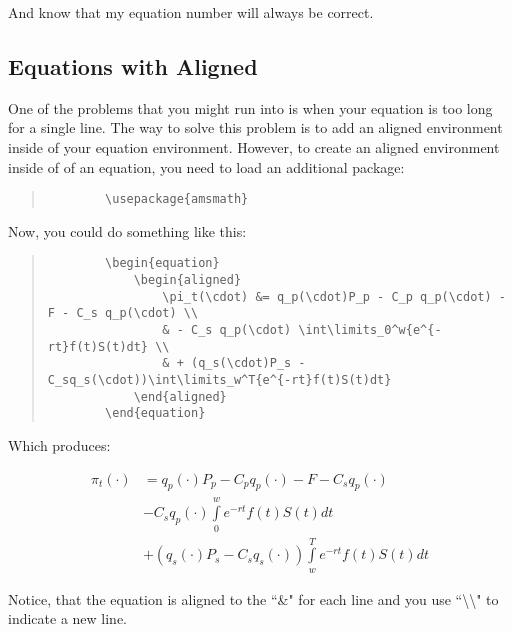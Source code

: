 And know that my equation number will always be correct.

\subsection{Equations with Aligned}

One of the problems that you might run into is when your equation is too long for a single line.  The way to solve this problem is to add an aligned environment inside of your equation environment.  However, to create an aligned environment inside of of an equation, you need to load an additional package:

\begin{quote}
	\begin{verbatim}
		\usepackage{amsmath}
	\end{verbatim}
\end{quote}

Now, you could do something like this:

\begin{quote}
	\begin{verbatim}
		\begin{equation}
			\begin{aligned}
	  			\pi_t(\cdot) &= q_p(\cdot)P_p - C_p q_p(\cdot) - F - C_s q_p(\cdot) \\
	  			& - C_s q_p(\cdot) \int\limits_0^w{e^{-rt}f(t)S(t)dt} \\
	  			& + (q_s(\cdot)P_s - C_sq_s(\cdot))\int\limits_w^T{e^{-rt}f(t)S(t)dt}
	 		\end{aligned}
		\end{equation}
	\end{verbatim}
\end{quote}

Which produces:

\begin{equation}
	\begin{aligned}
		\pi_t(\cdot) &= q_p(\cdot)P_p - C_p q_p(\cdot) - F - C_s q_p(\cdot) \\
	  	& - C_s q_p(\cdot) \int\limits_0^w{e^{-rt}f(t)S(t)dt} \\
	  	& + (q_s(\cdot)P_s - C_sq_s(\cdot))\int\limits_w^T{e^{-rt}f(t)S(t)dt}
	 \end{aligned}
\end{equation}

Notice, that the equation is aligned to the ``\&" for each line and you use ``\textbackslash \textbackslash" to indicate a new line.

